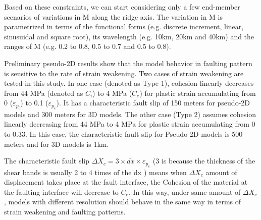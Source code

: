 Based on these constraints, we can start considering only a few end-member scenarios of variations in M along the ridge axis. The variation in M is parametrized in terms of the functional forms (e.g. discrete increment, linear, sinusuidal and square root), its wavelength (e.g. 10km, 20km and 40km) and the ranges of M (e.g. 0.2 to 0.8, 0.5 to 0.7 and 0.5 to 0.8). 

Preliminary pseudo-2D results show that the model behavior in faulting pattern is sensitive to the rate of strain weakening. Two cases of strain weakening are tested in this study. In one case (denoted as Type 1), cohesion linearly decreases from 44 MPa (denoted as $C_{i}$) to 4 MPa ($C_{e}$) for plastic strain accumulating from 0 ($\varepsilon_{p_{i}}$) to 0.1 ($\varepsilon_{p_{e}}$). It has a characteristic fault slip of 150 meters for pseudo-2D models and 300 meters for 3D models. The other case (Type 2) assumes cohesion linearly decreasing from 44 MPa to 4 MPa for plastic strain accumulating from 0 to 0.33. In this case, the characteristic fault slip for Pseudo-2D models is 500 meters and for 3D models is 1km.

The characteristic fault slip $\Delta X_{c}=3 \times dx \times \varepsilon_{p_{e}}$ (3 is because the thickness of the shear bands is usually 2 to 4 times of the dx \citep{Lavier2000}) means when $\Delta X_{c}$ amount of displacement takes place at the fault interface, the Cohesion of the material at the faulting interface will decrease to $C_{e}$. In this way, under same amount of $\Delta X_{c}$, models with different resolution should behave in the same way in terms of strain weakening and faulting patterns. 

\subsection{}

